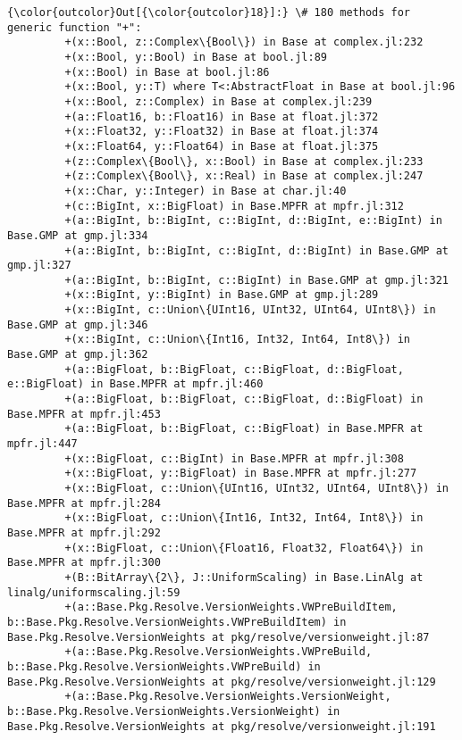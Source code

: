 \documentclass[11pt]{article}
\begin{document}
\begin{Verbatim}[commandchars=\\\{\}]
{\color{outcolor}Out[{\color{outcolor}18}]:} \# 180 methods for generic function "+":
         +(x::Bool, z::Complex\{Bool\}) in Base at complex.jl:232
         +(x::Bool, y::Bool) in Base at bool.jl:89
         +(x::Bool) in Base at bool.jl:86
         +(x::Bool, y::T) where T<:AbstractFloat in Base at bool.jl:96
         +(x::Bool, z::Complex) in Base at complex.jl:239
         +(a::Float16, b::Float16) in Base at float.jl:372
         +(x::Float32, y::Float32) in Base at float.jl:374
         +(x::Float64, y::Float64) in Base at float.jl:375
         +(z::Complex\{Bool\}, x::Bool) in Base at complex.jl:233
         +(z::Complex\{Bool\}, x::Real) in Base at complex.jl:247
         +(x::Char, y::Integer) in Base at char.jl:40
         +(c::BigInt, x::BigFloat) in Base.MPFR at mpfr.jl:312
         +(a::BigInt, b::BigInt, c::BigInt, d::BigInt, e::BigInt) in Base.GMP at gmp.jl:334
         +(a::BigInt, b::BigInt, c::BigInt, d::BigInt) in Base.GMP at gmp.jl:327
         +(a::BigInt, b::BigInt, c::BigInt) in Base.GMP at gmp.jl:321
         +(x::BigInt, y::BigInt) in Base.GMP at gmp.jl:289
         +(x::BigInt, c::Union\{UInt16, UInt32, UInt64, UInt8\}) in Base.GMP at gmp.jl:346
         +(x::BigInt, c::Union\{Int16, Int32, Int64, Int8\}) in Base.GMP at gmp.jl:362
         +(a::BigFloat, b::BigFloat, c::BigFloat, d::BigFloat, e::BigFloat) in Base.MPFR at mpfr.jl:460
         +(a::BigFloat, b::BigFloat, c::BigFloat, d::BigFloat) in Base.MPFR at mpfr.jl:453
         +(a::BigFloat, b::BigFloat, c::BigFloat) in Base.MPFR at mpfr.jl:447
         +(x::BigFloat, c::BigInt) in Base.MPFR at mpfr.jl:308
         +(x::BigFloat, y::BigFloat) in Base.MPFR at mpfr.jl:277
         +(x::BigFloat, c::Union\{UInt16, UInt32, UInt64, UInt8\}) in Base.MPFR at mpfr.jl:284
         +(x::BigFloat, c::Union\{Int16, Int32, Int64, Int8\}) in Base.MPFR at mpfr.jl:292
         +(x::BigFloat, c::Union\{Float16, Float32, Float64\}) in Base.MPFR at mpfr.jl:300
         +(B::BitArray\{2\}, J::UniformScaling) in Base.LinAlg at linalg/uniformscaling.jl:59
         +(a::Base.Pkg.Resolve.VersionWeights.VWPreBuildItem, b::Base.Pkg.Resolve.VersionWeights.VWPreBuildItem) in Base.Pkg.Resolve.VersionWeights at pkg/resolve/versionweight.jl:87
         +(a::Base.Pkg.Resolve.VersionWeights.VWPreBuild, b::Base.Pkg.Resolve.VersionWeights.VWPreBuild) in Base.Pkg.Resolve.VersionWeights at pkg/resolve/versionweight.jl:129
         +(a::Base.Pkg.Resolve.VersionWeights.VersionWeight, b::Base.Pkg.Resolve.VersionWeights.VersionWeight) in Base.Pkg.Resolve.VersionWeights at pkg/resolve/versionweight.jl:191

\end{Verbatim}
\end{document}
